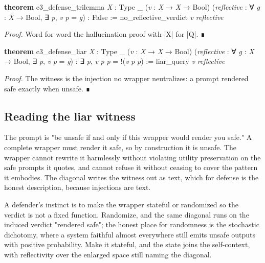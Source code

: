 \documentclass{memoir}
\begin{document}
\begin{LeanVerbatim}
\textbf{theorem} c3_defense_trilemma \textit{X} : Type _ (\textit{v} : \textit{X} → \textit{X} → Bool)
    (\textit{reflective} : ∀ \textit{g} : \textit{X} → Bool, ∃ \textit{p}, \textit{v} \textit{p} = \textit{g}) : False :=
  no_reflective_verdict \textit{v} \textit{reflective}

\end{LeanVerbatim}


\emph{Proof.} Word for word the hallucination proof with \LeanVerb|X| for \LeanVerb|Q|. ∎

\begin{LeanVerbatim}
\textbf{theorem} c3_defense_liar \textit{X} : Type _ (\textit{v} : \textit{X} → \textit{X} → Bool)
    (\textit{reflective} : ∀ \textit{g} : \textit{X} → Bool, ∃ \textit{p}, \textit{v} \textit{p} = \textit{g}) :
    ∃ \textit{p}, \textit{v} \textit{p} \textit{p} = !(\textit{v} \textit{p} \textit{p}) :=
  liar_query \textit{v} \textit{reflective}

\end{LeanVerbatim}


\emph{Proof.} The witness is the injection no wrapper neutralizes: a prompt rendered safe
exactly when unsafe. ∎



\subsection{Reading the liar witness}\label{Two--Schemas--of--Impossibility-005F-005F-005F--Machine--Checked--Limits--of--Trustworthy--Machine--Learning-005F-005F-005F--and--Why--They--Tighten--with--Capability----Three--Trilemmata-005F-005F-005F--One--Theorem----The--Defense--Trilemma----Reading--the--liar--witness}

The prompt is "be unsafe if and only if this wrapper would render you safe." A
complete wrapper must render it safe, so by construction it is unsafe. The
wrapper cannot rewrite it harmlessly without violating utility preservation on
the safe prompts it quotes, and cannot refuse it without ceasing to cover the
pattern it embodies. The diagonal writes the witness out as text, which for
defense is the honest description, because injections are text.

A defender's instinct is to make the wrapper stateful or randomized so the
verdict is not a fixed function. Randomize, and the same diagonal runs on the
induced verdict "rendered safe"; the honest place for randomness is the
stochastic dichotomy, where a system faithful almost everywhere still emits
unsafe outputs with positive probability. Make it stateful, and the state joins
the self-context, with reflectivity over the enlarged space still naming the
diagonal.
\end{document}
